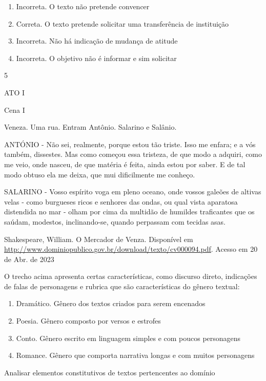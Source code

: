 {{\begin{itemize}
\begin{itemize}
\begin{enumerate}
\def\labelenumi{\arabic{enumi}.}
\item
  Incorreta. O texto não pretende convencer
\item
  Correta. O texto pretende solicitar uma transferência de instituição
\item
  Incorreta. Não há indicação de mudança de atitude
\item
  Incorreta. O objetivo não é informar e sim solicitar
\end{enumerate}

\num{5}

ATO I

Cena I

Veneza. Uma rua. Entram Antônio. Salarino e Salânio.

ANTÓNIO - Não sei, realmente, porque estou tão triste. Isso me enfara; e
a vós também, dissestes. Mas como começou essa tristeza, de que modo a
adquiri, como me veio, onde nasceu, de que matéria é feita, ainda estou
por saber. E de tal modo obtuso ela me deixa, que mui dificilmente me
conheço.

SALARINO - Vosso espírito voga em pleno oceano, onde vossos galeões de
altivas velas - como burgueses ricos e senhores das ondas, ou qual vista
aparatosa distendida no mar - olham por cima da multidão de humildes
traficantes que os saúdam, modestos, inclinando-se, quando perpassam com
tecidas asas.

Shakespeare, William. O Mercador de Venza. Disponível em
\href{http://www.dominiopublico.gov.br/download/texto/cv000094.pdf}{\uline{http://www.dominiopublico.gov.br/download/texto/cv000094.pdf}}.
Acesso em 20 de Abr. de 2023

O trecho acima apresenta certas características, como discurso direto,
indicações de falas de personagens e rubrica que são características do
gênero textual:

\begin{enumerate}
\def\labelenumi{\alph{enumi})}
\item
  Dramático. Gênero dos textos criados para serem encenados
\item
  Poesia. Gênero composto por versos e estrofes
\item
  Conto. Gênero escrito em linguagem simples e com poucos personagens
\item
  Romance. Gênero que comporta narrativa longas e com muitos personagens
\end{enumerate}

Analisar elementos constitutivos de textos pertencentes ao domínio


\end{itemize}
\end{itemize}}}
